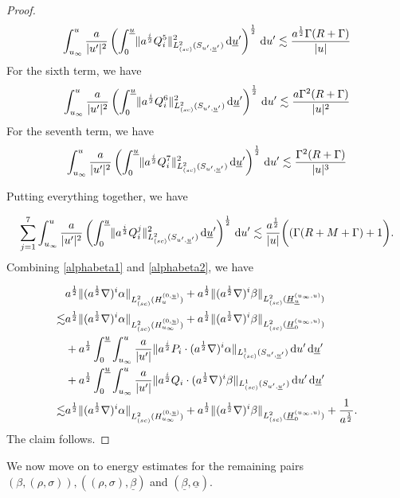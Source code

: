 \documentclass{amsart}
\newcommand{\aln}{(\al \nabla)^i}
\newcommand{\ali}{a^{\frac{i}{2}}}
\newcommand{\dubarprime}{\hspace{.5mm} \text{d} \ubar^{\prime}}
\newcommand{\intu}{\int_{u_{\infty}}^u}
\newcommand{\intubar}{\int_0^{\ubar}}
\newcommand{\upr}{\lvert u^\prime \rvert}
\newcommand{\al}{a^{\frac{1}{2}}}
\newcommand{\ubar}{\underline{u}}
\newcommand{\scaleoneSuprimeubarprime}[1]{\lVert{#1} \rVert_{L^1_{(sc)}(S_{u^\prime,\ubar^\prime})}}
\newcommand{\scaletwoSuprimeubarprime}[1]{\lVert{#1} \rVert_{L^2_{(sc)}(S_{u^\prime,\ubar^\prime})}}
\newcommand{\alphabar}{\underline{\alpha}}
\newcommand{\betabar}{\underline{\beta}}
\newcommand{\scaletwoHzero}[1]{\lVert{#1} \rVert_{L^2_{(sc)}(H_{u_{\infty}}^{(0,\underline{u})})}}
\newcommand{\scaletwoHu}[1]{\lVert{#1} \rVert_{L^2_{(sc)}(H_u^{(0,\underline{u})})}}
\newcommand{\scaletwoHbarzero}[1]{\lVert{#1} \rVert_{L^2_{(sc)}(\underline{H}_{0}^{(u_{\infty},u)})}}
\newcommand{\scaletwoHbaru}[1]{\lVert{#1} \rVert_{L^2_{(sc)}(\underline{H}_{\underline{u}}^{(u_{\infty},u)})}}
\newcommand{\duprime}{\hspace{.5mm} \text{d}u^{\prime}}
\begin{document}
{\begin{proof}
\begin{equation}
    \intu \frac{a}{\upr^2}\left( \intubar \scaletwoSuprimeubarprime{\ali Q_i^5}^2 \dubarprime \right)^{\frac{1}{2}} \duprime \lesssim \frac{\al \Gamma (R+\Gamma)}{\lvert u \rvert}
\end{equation} For the sixth term, we have 
\begin{equation}
    \intu \frac{a}{\upr^2}\left( \intubar \scaletwoSuprimeubarprime{\ali Q_i^6}^2 \dubarprime \right)^{\frac{1}{2}} \duprime \lesssim \frac{a\Gamma^2 (R+\Gamma)}{\lvert u \rvert^2}
\end{equation}For the seventh term, we have
\begin{equation}
    \intu \frac{a}{\upr^2}\left( \intubar \scaletwoSuprimeubarprime{\ali Q_i^7}^2 \dubarprime \right)^{\frac{1}{2}} \duprime \lesssim \frac{\Gamma^2 (R+\Gamma)}{\lvert u \rvert^3}
\end{equation}

\par \noindent Putting everything together, we have

\begin{equation}\label{alphabeta2}
    \sum_{j=1}^7 \intu \frac{a}{\upr^2} \left( \intubar \scaletwoSuprimeubarprime{\ali Q_i^j}^2 \dubarprime\right)^{\frac{1}{2}} \duprime \lesssim \frac{a^{\frac{1}{2}}}{|u|}\bigg( (\Gamma(R+M+\Gamma)+1\bigg).
\end{equation}Combining \eqref{alphabeta1} and \eqref{alphabeta2}, we have 

\begin{equation}
    \begin{split}
        & a^{\frac{1}{2}} \scaletwoHu{\aln \alpha} + a^{\frac{1}{2}}\scaletwoHbaru{\aln \beta} \\ \lesssim & a^{\frac{1}{2}} \scaletwoHzero{\aln \alpha} + a^{\frac{1}{2}} \scaletwoHbarzero{\aln \beta} \\&+  a^{\frac{1}{2}} \intubar \intu  \frac{a}{\upr} \scaleoneSuprimeubarprime{\ali P_i \cdot \aln \alpha }  \duprime \dubarprime
        \\ &+ a^{\frac{1}{2}} \intubar \intu  \frac{a}{\upr} \scaleoneSuprimeubarprime{\ali Q_i \cdot \aln \beta }  \duprime \dubarprime \\ \lesssim &a^{\frac{1}{2}} \scaletwoHzero{\aln \alpha} + a^{\frac{1}{2}} \scaletwoHbarzero{\aln \beta} + \frac{1}{a^{\frac{1}{2}}}.
        \end{split}
\end{equation}The claim follows.
\end{proof}\noindent We now move on to energy estimates for the remaining pairs $(\beta, (\rho,\sigma)), ((\rho,\sigma),\betabar)$ and $(\betabar, \alphabar)$.





}
\end{document}
